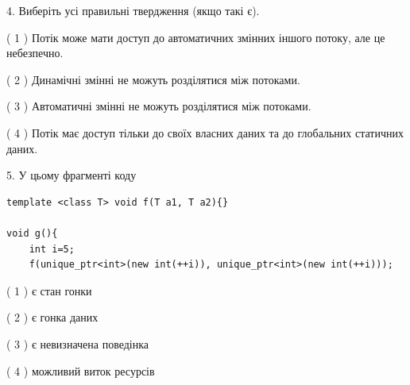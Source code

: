 \documentclass[12pt, ukrainian]{article}
\begin{document}
\begin {large}
{%
4. Виберіть усі правильні твердження (якщо такі є).\par
\vspace{2mm}

( 1 ) Потік може мати доступ до автоматичних змінних іншого потоку, але це небезпечно.%

( 2 ) Динамічні змінні не можуть розділятися між потоками.%

( 3 ) Автоматичні змінні не можуть розділятися між потоками.%

( 4 ) Потік має доступ тільки до своїх власних даних та до глобальних статичних даних.%


5. У цьому фрагменті коду
\begin{verbatim}
template <class T> void f(T a1, T a2){}

void g(){
    int i=5;
    f(unique_ptr<int>(new int(++i)), unique_ptr<int>(new int(++i)));
\end{verbatim}

( 1 ) є стан гонки%

( 2 ) є гонка даних%

( 3 ) є невизначена поведінка%

( 4 ) можливий виток ресурсів%
}
\end {large}
\end{document}
